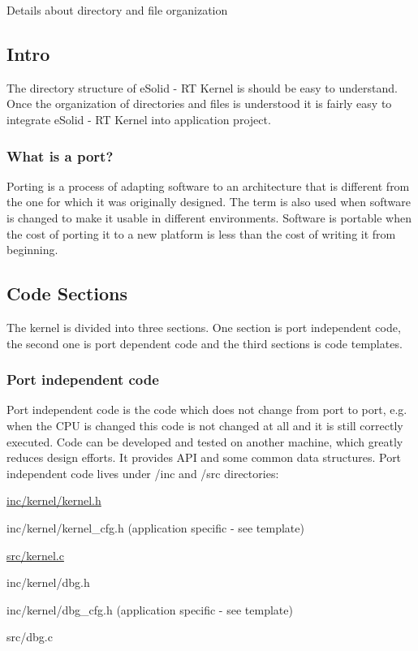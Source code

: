 Details about directory and file organization\hypertarget{files_org_files_intro}{}\subsection{Intro}\label{files_org_files_intro}
The directory structure of e\-Solid -\/ R\-T Kernel is should be easy to understand. Once the organization of directories and files is understood it is fairly easy to integrate e\-Solid -\/ R\-T Kernel into application project.\hypertarget{files_org_files_porting}{}\subsubsection{What is a port?}\label{files_org_files_porting}
Porting is a process of adapting software to an architecture that is different from the one for which it was originally designed. The term is also used when software is changed to make it usable in different environments. Software is portable when the cost of porting it to a new platform is less than the cost of writing it from beginning.\hypertarget{files_org_files_sections}{}\subsection{Code Sections}\label{files_org_files_sections}
The kernel is divided into three sections. One section is port independent code, the second one is port dependent code and the third sections is code templates.\hypertarget{files_org_files_icode}{}\subsubsection{Port independent code}\label{files_org_files_icode}
Port independent code is the code which does not change from port to port, e.\-g. when the C\-P\-U is changed this code is not changed at all and it is still correctly executed. Code can be developed and tested on another machine, which greatly reduces design efforts. It provides A\-P\-I and some common data structures. Port independent code lives under {\ttfamily /inc} and {\ttfamily /src} directories\-:
\begin{DoxyItemize}
\item {\ttfamily \hyperlink{kernel_8h}{inc/kernel/kernel.\-h}}
\item {\ttfamily inc/kernel/kernel\-\_\-cfg.\-h} (application specific -\/ see template)
\item {\ttfamily \hyperlink{kernel_8c}{src/kernel.\-c}}
\item {\ttfamily inc/kernel/dbg.\-h}
\item {\ttfamily inc/kernel/dbg\-\_\-cfg.\-h} (application specific -\/ see template)
\item {\ttfamily src/dbg.\-c}
\end{DoxyItemize}

